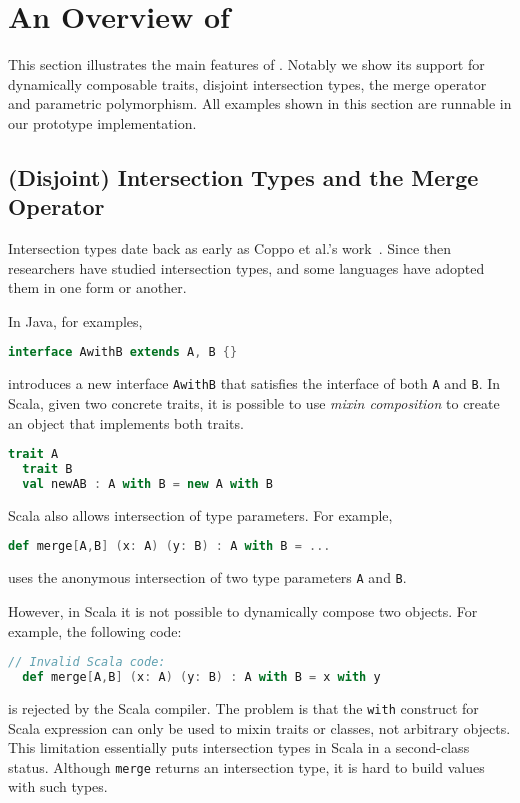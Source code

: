 \section{An Overview of \name}



This section illustrates the main features of \name. Notably we show its support
for dynamically composable traits, disjoint intersection types, the merge
operator and parametric polymorphism. All examples shown in this section are
runnable in our prototype implementation.

\subsection{(Disjoint) Intersection Types and the Merge Operator}
\label{sec:intersection}

Intersection types date back as early as Coppo et al.'s
work~\cite{coppo1981functional}. Since then researchers have studied
intersection types, and some languages have adopted them in one form or another.

In Java, for examples,
\begin{lstlisting}[language=java]
  interface AwithB extends A, B {}
\end{lstlisting}
introduces a new interface \lstinline$AwithB$ that satisfies the interface of
both \lstinline{A} and \lstinline{B}. In Scala, given two concrete traits, it is
possible to use \textit{mixin composition} to create an object that implements
both traits.
\begin{lstlisting}[language=scala]
  trait A
  trait B
  val newAB : A with B = new A with B
\end{lstlisting}
Scala also allows intersection of type parameters. For example,
\begin{lstlisting}[language=scala]
  def merge[A,B] (x: A) (y: B) : A with B = ...
\end{lstlisting}
uses the anonymous intersection of two type parameters \lstinline{A} and
\lstinline{B}.

However, in Scala it is not possible to dynamically compose two objects. For
example, the following code:
\begin{lstlisting}[language=scala]
  // Invalid Scala code:
  def merge[A,B] (x: A) (y: B) : A with B = x with y
\end{lstlisting}
is rejected by the Scala compiler. The problem is that the \lstinline$with$
construct for Scala expression can only be used to mixin traits or classes, not
arbitrary objects. This limitation essentially puts intersection types in Scala
in a second-class status. Although \lstinline{merge} returns an intersection
type, it is hard to build values with such types.

